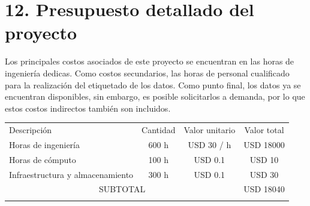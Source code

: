 \documentclass[
11pt, %
]{charter}
\begin{document}
\section{12. Presupuesto detallado del proyecto}
\label{sec:presupuesto}

Los principales costos asociados de este proyecto se encuentran en las horas de ingeniería dedicas. Como costos secundarios, las horas de personal cualificado para la realización del etiquetado de los datos. Como punto final, los datos ya se encuentran disponibles, sin embargo, es posible solicitarlos a demanda, por lo que estos costos indirectos también son incluidos.

\begin{table}[htpb]
  \centering
  \begin{tabularx}{\linewidth}{@{}|X|c|r|r|@{}}
    \hline
    \rowcolor[HTML]{C0C0C0}
    \multicolumn{4}{|c|}{\cellcolor[HTML]{C0C0C0}COSTOS DIRECTOS}   \\ \hline

    \rowcolor[HTML]{C0C0C0} Descripción                         &
    \multicolumn{1}{c|}{\cellcolor[HTML]{C0C0C0}Cantidad}       &
    \multicolumn{1}{c|}{\cellcolor[HTML]{C0C0C0}Valor unitario} &
    \multicolumn{1}{c|}{\cellcolor[HTML]{C0C0C0}Valor total}        \\ \hline

    Horas de ingeniería                                         &
    \multicolumn{1}{c|}{600 h}                                  &
    \multicolumn{1}{c|}{USD 30 / h}                             &
    \multicolumn{1}{c|}{USD 18000}                                  \\ \hline

    Horas de cómputo                                            &
    \multicolumn{1}{c|}{100 h}                                  &
    \multicolumn{1}{c|}{USD 0.1}                                &
    \multicolumn{1}{c|}{USD 10}                                     \\ \hline

    Infraestructura y almacenamiento                            &
    \multicolumn{1}{c|}{300 h}                                  &
    \multicolumn{1}{c|}{USD 0.1}                                &
    \multicolumn{1}{c|}{USD 30}                                     \\ \hline

    \multicolumn{3}{|c|}{SUBTOTAL}                              &
    \multicolumn{1}{c|}{USD 18040}                                  \\ \hline
    \rowcolor[HTML]{C0C0C0}
    \multicolumn{4}{|c|}{\cellcolor[HTML]{C0C0C0}COSTOS INDIRECTOS} \\ \hline


\end{tabularx}
\end{table}
\end{document}

